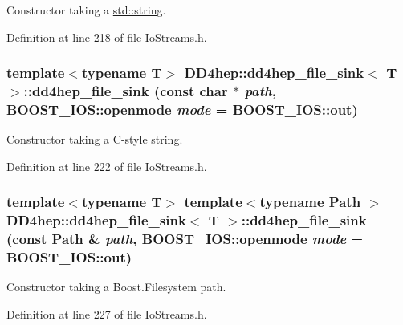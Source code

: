 Constructor taking a \hyperlink{classstd_1_1string}{std::string}. 

Definition at line 218 of file IoStreams.h.\hypertarget{class_d_d4hep_1_1dd4hep__file__sink_aae006859555f5fe1ee2d834358476273}{
\subsubsection[{dd4hep\_\-file\_\-sink}]{\setlength{\rightskip}{0pt plus 5cm}template$<$typename T$>$ {\bf DD4hep::dd4hep\_\-file\_\-sink}$<$ {\bf T} $>$::{\bf dd4hep\_\-file\_\-sink} (const char $\ast$ {\em path}, \/  BOOST\_\-IOS::openmode {\em mode} = {\ttfamily BOOST\_\-IOS::out})}}
\label{class_d_d4hep_1_1dd4hep__file__sink_aae006859555f5fe1ee2d834358476273}


Constructor taking a C-\/style string. 

Definition at line 222 of file IoStreams.h.\hypertarget{class_d_d4hep_1_1dd4hep__file__sink_a621a67e659fb867ff45ea8d711123970}{
\subsubsection[{dd4hep\_\-file\_\-sink}]{\setlength{\rightskip}{0pt plus 5cm}template$<$typename T$>$ template$<$typename Path $>$ {\bf DD4hep::dd4hep\_\-file\_\-sink}$<$ {\bf T} $>$::{\bf dd4hep\_\-file\_\-sink} (const {\bf Path} \& {\em path}, \/  BOOST\_\-IOS::openmode {\em mode} = {\ttfamily BOOST\_\-IOS::out})}}
\label{class_d_d4hep_1_1dd4hep__file__sink_a621a67e659fb867ff45ea8d711123970}


Constructor taking a Boost.Filesystem path. 

Definition at line 227 of file IoStreams.h.

